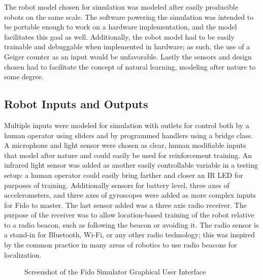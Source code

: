 The robot model chosen for simulation was modeled after easily producible robots on the same scale.  The software powering the simulation was intended to be portable enough to work on a hardware implementation, and the model facilitates this goal as well.  Additionally, the robot model had to be easily trainable and debuggable when implemented in hardware; as such, the use of a Geiger counter as an input would be unfavorable.  Lastly the sensors and design chosen had to facilitate the concept of natural learning, modeling after nature to some degree.

\subsection{Robot Inputs and Outputs}

Multiple inputs were modeled for simulation with outlets for control both by a human operator using sliders and by programmed handlers using a bridge class.  A microphone and light sensor were chosen as clear, human modifiable inputs that model after nature and could easily be used for reinforcement training.  An infrared light sensor was added as another easily controllable variable in a testing setup: a human operator could easily bring farther and closer an IR LED for purposes of training.   Additionally sensors for battery level, three axes of accelerometers, and three axes of gyroscopes were added as more complex inputs for Fido to master.  The last sensor added was a three axis radio receiver.  The purpose of the receiver was to allow location-based training of the robot relative to a radio beacon, such as following the beacon or avoiding it.  The radio sensor is a stand-in for Bluetooth, Wi-Fi, or any other radio technology; this was inspired by the common practice in many areas of robotics to use radio beacons for localization.

\begin{figure}
	\centering
	\caption{Screenshot of the Fido Simulator Graphical User Interface}
\end{figure}

